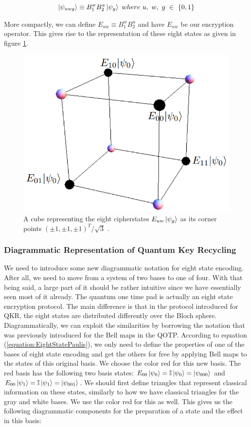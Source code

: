 \documentclass[]{article}
\begin{document}
\begin{equation}
	\label{equation:EightStatePaulis}
	\ket{\psi_{uwg}} \equiv B_1^w B_2^u\ket{\psi_{g}}~where~ u,~ w,~ g~ \in~ \{0,1\}
\end{equation}

More compactly, we can define $E_{uw} \equiv B_1^w B_2^u$ and have $E_{uw}$ be our encryption operator. This gives rise to the representation of these eight states as given in figure \ref{fig:eightstatecube}.

\begin{center}
\begin{figure}
	\begin{center}
	\includegraphics[width=0.5\linewidth]{Eightstatecube.png}
	\caption{A cube representing the eight cipherstates $E_{uw}\ket{\psi_{g}}$ as its corner points $(\pm1,\pm1,\pm1)^T/\sqrt{3}$ \cite{DeVries2016}.}
	\label{fig:eightstatecube}
	\end{center}
\end{figure}
\end{center}

\subsubsection{Diagrammatic Representation of Quantum Key Recycling}
We need to introduce some new diagrammatic notation for eight state encoding. After all, we need to move from a system of two bases to one of four. With that being said, a large part of it should be rather intuitive since we have essentially seen most of it already. The quantum one time pad is actually an eight state encryption protocol. The main difference is that in the protocol introduced for QKR, the eight states are distributed differently over the Bloch sphere. Diagrammatically, we can exploit the similarities by borrowing the notation that was previously introduced for the Bell maps in the QOTP. According to equation (\ref{equation:EightStatePaulis}), we only need to define the properties of one of the bases of eight state encoding and get the others for free by applying Bell maps to the states of this original basis. We choose the color red for this new basis. The red basis has the following two basis states: $E_{00}\ket{\psi_{0}} = \mathbb{I}\ket{\psi_{0}} = \ket{\psi_{000}}$ and $E_{00}\ket{\psi_{1}} = \mathbb{I}\ket{\psi_{1}} = \ket{\psi_{001}}$. We should first define triangles that represent classical information on these states, similarly to how we have classical triangles for the gray and white bases. We use the color red for this as well. This gives us the following diagrammatic components for the preparation of a state and the effect in this basis:
\end{document}
